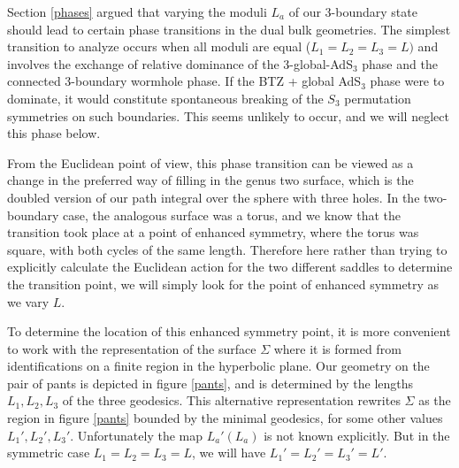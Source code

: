 \documentclass[12pt]{article}
\numberwithin{equation}{section}
\begin{document}
Section \ref{phases} argued that varying the moduli $L_a$ of our 3-boundary state should lead to certain phase transitions in the dual bulk geometries.
The simplest transition to analyze occurs when all moduli are equal ($L_1 = L_2 = L_3 =L)$ and involves the exchange of relative dominance of the 3-global-AdS${}_3$ phase and the connected 3-boundary wormhole phase.  If the BTZ + global AdS${}_3$ phase were to dominate, it would constitute spontaneous breaking of the $S_3$ permutation symmetries on such boundaries.  This seems unlikely to occur, and we will neglect this phase below.

From the Euclidean point of view, this phase transition can be viewed as a change in the preferred way of filling in the genus two surface, which is the doubled version of our path integral over the sphere with three holes. In the two-boundary case, the analogous surface was a torus, and we know that the transition took place at a point of enhanced symmetry, where the torus was square, with both cycles of the same length. Therefore here rather than trying to explicitly calculate the Euclidean action for the two different saddles to determine the transition point, we will simply look for the point of enhanced symmetry as we vary $L$.

To determine the location of this enhanced symmetry point, it is more convenient to work with the representation of the surface $\Sigma$ where it is formed from identifications on a finite region in the hyperbolic plane. Our geometry on the pair of pants is depicted in figure \ref{pants}, and is determined by the lengths $L_1, L_2, L_3$ of the three geodesics. This alternative representation rewrites $\Sigma$ as the region in figure \ref{pants} bounded by the minimal geodesics, for some other values $L_1', L_2', L_3'$. Unfortunately the map $L_a'(L_a)$ is not known explicitly. But in the symmetric case $L_1 = L_2 = L_3 = L$, we will have $L_1' = L_2' = L_3' = L'$.
\end{document}
